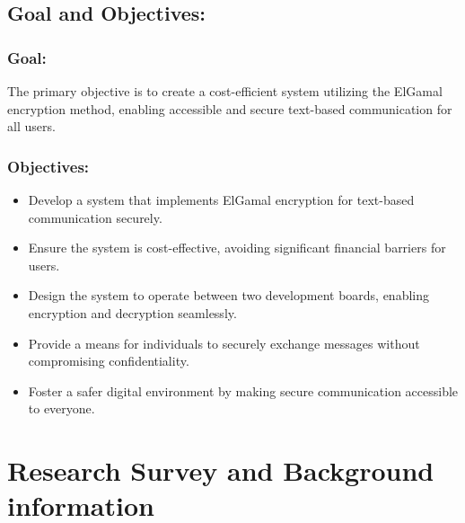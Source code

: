 \documentclass[12pt]{article}
\begin{document}
	\subsection{Goal and Objectives:}
	\subsubsection{Goal:}
	The primary objective is to create a cost-efficient system utilizing the ElGamal encryption method, enabling accessible and secure text-based communication for all users.
	
	\subsubsection{Objectives:}
	\begin{itemize}
		\item Develop a system that implements ElGamal encryption for text-based communication securely.
		\item Ensure the system is cost-effective, avoiding significant financial barriers for users.
		\item Design the system to operate between two development boards, enabling encryption and decryption seamlessly.
		\item Provide a means for individuals to securely exchange messages without compromising confidentiality.
		\item Foster a safer digital environment by making secure communication accessible to everyone.
	\end{itemize}
\newpage
	\section{Research Survey and Background information}
\end{document}
